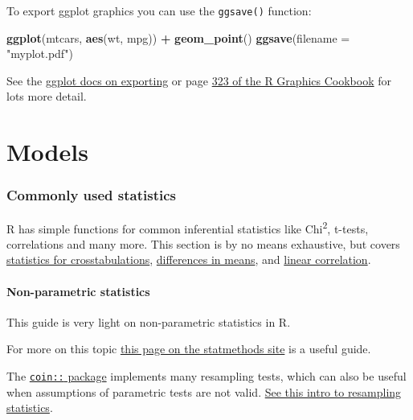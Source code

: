 \documentclass[]{article}
\newenvironment{Shaded}{\begin{snugshade}}{\end{snugshade}}
\newcommand{\DataTypeTok}[1]{\textcolor[rgb]{0.13,0.29,0.53}{#1}}
\newcommand{\KeywordTok}[1]{\textcolor[rgb]{0.13,0.29,0.53}{\textbf{#1}}}
\newcommand{\NormalTok}[1]{#1}
\newcommand{\OperatorTok}[1]{\textcolor[rgb]{0.81,0.36,0.00}{\textbf{#1}}}
\newcommand{\StringTok}[1]{\textcolor[rgb]{0.31,0.60,0.02}{#1}}
\begin{document}
To export ggplot graphics you can use the \texttt{ggsave()} function:

\begin{Shaded}
\begin{Highlighting}[]

\KeywordTok{ggplot}\NormalTok{(mtcars, }\KeywordTok{aes}\NormalTok{(wt, mpg)) }\OperatorTok{+}\StringTok{ }\KeywordTok{geom_point}\NormalTok{()}
\KeywordTok{ggsave}\NormalTok{(}\DataTypeTok{filename =} \StringTok{"myplot.pdf"}\NormalTok{)}
\end{Highlighting}
\end{Shaded}

See the
\href{http://ggplot2.tidyverse.org/reference/ggsave.html}{ggplot docs on exporting}
or page
\href{https://ase.tufts.edu/bugs/guide/assets/R\%20Graphics\%20Cookbook.pdf}{323 of the R Graphics Cookbook}
for lots more detail.

\hypertarget{part-models}{%
\part{Models}\label{part-models}}

\hypertarget{common-stats}{%
\section{Commonly used statistics}\label{common-stats}}

R has simple functions for common inferential statistics like Chi\textsuperscript{2}, t-tests,
correlations and many more. This section is by no means exhaustive, but covers
\protect\hyperlink{crosstabs}{statistics for crosstabulations}, \protect\hyperlink{t-tests}{differences in means},
and \protect\hyperlink{correlations}{linear correlation}.

\hypertarget{nonparametrics}{%
\subsection{Non-parametric statistics}\label{nonparametrics}}

This guide is very light on non-parametric statistics in R.

For more on this topic
\href{http://www.statmethods.net/stats/nonparametric.html}{this page on the statmethods site}
is a useful guide.

The \href{http://finzi.psych.upenn.edu/R/library/coin/doc/coin.pdf}{\texttt{coin::} package}
implements many resampling tests, which can also be useful when assumptions of
parametric tests are not valid.
\href{http://www.statmethods.net/stats/resampling.html}{See this intro to resampling statistics}.
\end{document}
